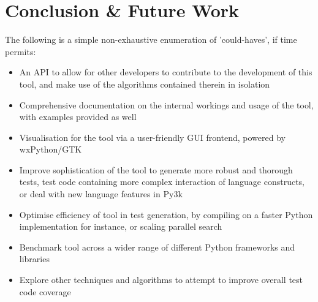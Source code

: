 \documentclass{icldt}
\numberwithin{equation}{section}       %
\begin{document}
{\chapter{Conclusion \& Future Work}
\label{ch:conclusion}
The following is a simple non-exhaustive enumeration of 'could-haves', if time permits:
\begin{itemize}
	\item An API to allow for other developers to contribute to the development of this tool, and make use of the algorithms contained therein in isolation
	\item Comprehensive documentation on the internal workings and usage of the tool, with examples provided as well
	\item Visualisation for the tool via a user-friendly GUI frontend, powered by wxPython/GTK
	\item Improve sophistication of the tool to generate more robust and thorough tests, test code containing more complex interaction of language constructs, or deal with new language features in Py3k
	\item Optimise efficiency of tool in test generation, by compiling on a faster Python implementation for instance, or scaling parallel search
	\item Benchmark tool across a wider range of different Python frameworks and libraries
	\item Explore other techniques and algorithms to attempt to improve overall test code coverage
\end{itemize}

\nocite{*}

\appendix
}
\end{document}
